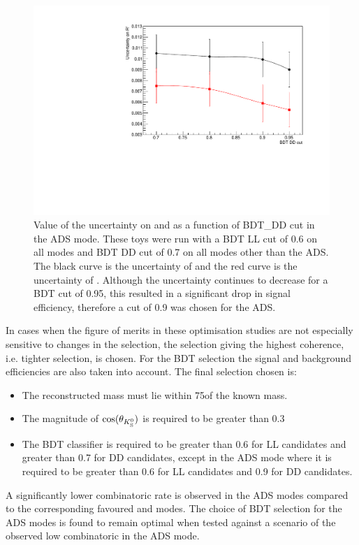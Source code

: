 \begin{figure}
\centering
\includegraphics[width=0.8\linewidth]{figures/selection/ADSoptimisation.pdf}
\caption{Value of the uncertainty on \Rptwo and \Rmtwo as a function of BDT\_DD cut in the ADS mode. These toys were run with a BDT LL cut of 0.6 on all modes and BDT DD cut of 0.7 on all modes other than the ADS. The black curve is the uncertainty of \Rptwo and the red curve is the uncertainty of \Rmtwo. Although the uncertainty continues to decrease for a BDT cut of 0.95, this resulted in a significant drop in signal efficiency, therefore a cut of 0.9 was chosen for the ADS.}
\label{adsoptimisation}
\end{figure}

In cases when the figure of merits in these optimisation studies are not especially sensitive to changes in the selection, the selection giving the highest coherence, i.e. tighter \Kstarm selection, is chosen. For the BDT selection the signal and background efficiencies are also taken into account. The final selection chosen is:

\begin{itemize}
\item{The reconstructed \Kstarm mass must lie within 75\mev of the known \Kstarm mass.}
\item{The magnitude of $\cos(\theta_{{{K}^0_{\mathrm{ \scriptscriptstyle S}}}})$ is required to be greater than 0.3}
\item{The BDT classifier is required to be greater than 0.6 for LL candidates and greater than 0.7 for DD candidates, except in the ADS mode where it is required to be greater than 0.6 for LL candidates and 0.9 for DD candidates.}
\end{itemize}

A significantly lower combinatoric rate is observed in the ADS modes compared to the corresponding favoured \kpi and \kpipipi modes. The choice of BDT selection for the ADS modes is found to remain optimal when tested against a scenario of the observed low combinatoric in the ADS mode. 

